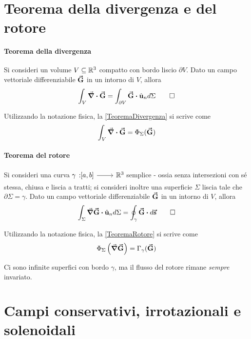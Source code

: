 \section{Teorema della divergenza e del rotore}
\paragraph{Teorema della divergenza}
\begin{theoremaqed}
	Si consideri un volume $V\subseteq\mathbb{R}^3$ compatto con bordo liscio $\partial V$. Dato un campo vettoriale differenziabile $\vb*{\va{G}}$ in un intorno di $V$, allora
	\begin{equation}
		\int_V\div{\vba{G}}=\int_{\partial V}\vba{G}\vdot \vbh{u}_nd\Sigma\label{TeoremaDivergenza}\qedhere
	\end{equation}
\end{theoremaqed}
Utilizzando la notazione fisica, la \ref{TeoremaDivergenza} si scrive come
\begin{equation}
	\int_V\div{\vb*{\va{G}}}=\Phi_\Sigma(\vb*{\va{G}})
\end{equation}
\paragraph{Teorema del rotore}
\begin{theoremaqed}
	Si consideri una curva $\funz[\gamma]{\left[a,b\right]}{\realset^3}$ semplice - ossia senza intersezioni con sé stessa, chiusa e liscia a tratti; si consideri inoltre una superficie $\Sigma$ liscia tale che $\partial \Sigma=\gamma$. Dato un campo vettoriale differenziabile $\vb*{\va{G}}$ in un intorno di $V$, allora
	\begin{equation}
		\int_\Sigma\grad{\vba{G}}\vdot\vbh{u}_nd\Sigma=\oint_{\gamma}\vba{G}\vdot d\vba{s}\label{TeoremaRotore}\qedhere
	\end{equation}
\end{theoremaqed}
Utilizzando la notazione fisica, la \ref{TeoremaRotore} si scrive come
\begin{equation}
	\Phi_\Sigma\left(\grad{\vb*{\va{G}}}\right)=\Gamma_\gamma(\vb*{\va{G}})
\end{equation}
\begin{observe}
	Ci sono infinite superfici con bordo $\gamma$, ma il flusso del rotore rimane \textit{sempre} invariato.
\end{observe}
\section{Campi conservativi, irrotazionali e solenoidali}
